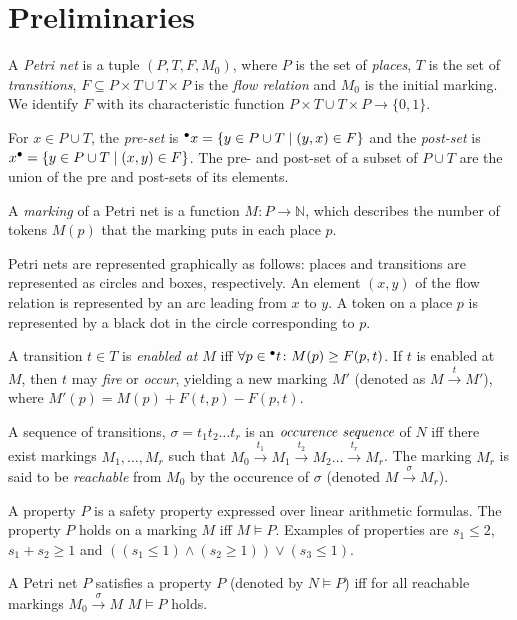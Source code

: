 \section{Preliminaries}

A \emph{Petri net} is a tuple $(P, T, F, M_0)$, where $P$ is the set of
\emph{places}, $T$ is the set of \emph{transitions},
$F \subseteq P\times T \cup T\times P$ is the \emph{flow relation}
and $M_0$ is the initial marking.
We identify $F$ with its characteristic function
$P\times T \cup T\times P \to \{0, 1\}$.

For $x\in P\cup T$, the \emph{pre-set} is
$\prescript{\bullet}{}{x}=\{y\in P\cup T\mid (y,x) \in F\}$
and the \emph{post-set} is $x^{\bullet}=\{y\in P\cup T\mid (x,y) \in F\}$.
The pre- and post-set of a subset of $P \cup T$ are the union of
the pre and post-sets of its elements.

A \emph{marking} of a Petri net is a function $M\colon P \to \mathbb{N}$,
which describes the number of tokens $M(p)$ that the marking puts in
each place $p$.

Petri nets are represented graphically as follows: places and transitions
are represented as circles and boxes, respectively. An element $(x,y)$
of the flow relation is represented by an arc leading from $x$ to $y$.
A token on a place $p$ is represented by a black dot in the circle
corresponding to $p$.

A transition $t \in T$ is \emph{enabled at $M$} iff
$\forall p \in \prescript{\bullet}{}{t} \colon M(p) \ge F(p, t)$.
If $t$ is enabled at $M$, then $t$ may \emph{fire} or \emph{occur},
yielding a new marking $M'$ (denoted as $M \xrightarrow{t} M'$),
where $M'(p) = M(p) + F(t,p) - F(p,t)$.

A sequence of transitions, $\sigma = t_1 t_2 \ldots t_r$ is an
$\emph{occurence sequence}$ of $N$ iff there exist markings
$M_1, \ldots, M_r$ such that $M_0 \xrightarrow{t_1} M_1
\xrightarrow{t_2} M_2 \ldots \xrightarrow{t_r} M_r$. The marking
$M_r$ is said to be \emph{reachable} from $M_0$ by the occurence
of $\sigma$ (denoted $M \xrightarrow{\sigma} M_r$).

A property $P$ is a safety property expressed over linear arithmetic
formulas. The property $P$ holds on a marking $M$ iff $M \models P$.
Examples of properties are $s_1 \le 2$, $s_1 + s_2 \ge 1$ and
$((s_1 \le 1) \land (s_2 \ge 1)) \lor (s_3 \le 1)$.

A Petri net $P$ satisfies a property $P$ (denoted by $N \models P$)
iff for all reachable markings $M_0 \xrightarrow{\sigma} M$
$M \models P$ holds.


\iffalse
\begin{verbatim}
 Examples:
  x + y < 0
  x + y < 0 \\and x + z > 0
  x + y < 0 \\or  x + z > 0

 ~P = (x + y <  0 \\and x + z >  0) \\or  x + z >  0
  P = (x + y >= 0 \\or  x + z <= 0) \\and x + z <= 0
\end{verbatim}
\fi
